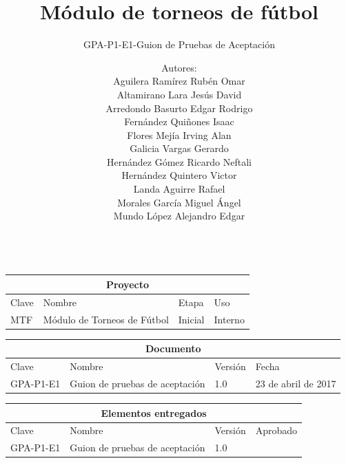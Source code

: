 \documentclass[oneside,10pt]{book}
\title{Módulo de torneos de fútbol }
\subtitle{GPA-P1-E1-Guion de Pruebas de Aceptación}
\author{Autores: \\Aguilera Ramírez Rubén Omar \\ Altamirano Lara Jesús David \\ Arredondo Basurto Edgar Rodrigo \\ Fernández Quiñones Isaac \\ Flores Mejía Irving Alan \\ Galicia Vargas Gerardo \\ Hernández Gómez Ricardo Neftali \\ Hernández Quintero Victor \\ Landa Aguirre Rafael\\ Morales García Miguel Ángel \\ Mundo López Alejandro Edgar \\ \\}
\begin{document}
\maketitle

\begin{table}[]
\centering
\label{my-label}
\begin{tabularx}{\textwidth}{ X l X X }
\multicolumn{4}{c}{\cellcolor[HTML]{CBCEFB}Proyecto}                                                                                         \\ \hline
\multicolumn{1}{|X|}{Clave} & \multicolumn{1}{X|}{Nombre}                      & \multicolumn{1}{X|}{Etapa}   & \multicolumn{1}{l|}{Uso}     \\ \hline
\multicolumn{1}{|X|}{MTF}   & \multicolumn{1}{l|}{Módulo de Torneos de Fútbol} & \multicolumn{1}{X|}{Inicial} & \multicolumn{1}{X|}{Interno} \\ \hline
\end{tabularx}
\end{table}

\begin{table}[]
\centering
\label{my-label}
\begin{tabularx}{\textwidth}{ X l X X }
\multicolumn{4}{c}{\cellcolor[HTML]{CBCEFB}Documento}                                                                                         \\ \hline
\multicolumn{1}{|X|}{Clave} 		& \multicolumn{1}{X|}{Nombre}                      		& \multicolumn{1}{X|}{Versión}   	& \multicolumn{1}{l|}{Fecha}     \\ \hline
\multicolumn{1}{|X|}{GPA-P1-E1}   	& \multicolumn{1}{l|}{Guion de pruebas de aceptación} 	& \multicolumn{1}{X|}{1.0} 		& \multicolumn{1}{X|}{23 de abril de 2017} \\ \hline
\end{tabularx}
\end{table}

\begin{table}[]
\centering
\label{my-label}
\begin{tabularx}{\textwidth}{ X l X X }
\multicolumn{4}{c}{\cellcolor[HTML]{CBCEFB}Elementos entregados}                                                                                         \\ \hline
\multicolumn{1}{|X|}{Clave} 		& \multicolumn{1}{X|}{Nombre}                      		& \multicolumn{1}{X|}{Versión}   	& \multicolumn{1}{l|}{Aprobado}     \\ \hline
\multicolumn{1}{|X|}{GPA-P1-E1}   	& \multicolumn{1}{l|}{Guion de pruebas de aceptación} 	& \multicolumn{1}{X|}{1.0} 		& \multicolumn{1}{X|}{ } \\ \hline
\end{tabularx}
\end{table}
\end{document}
